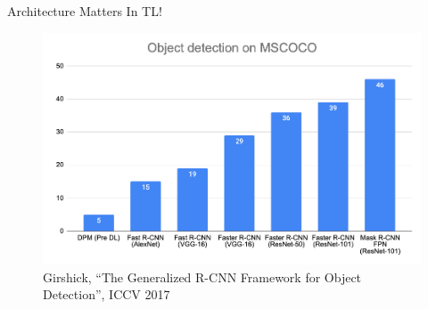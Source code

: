 \documentclass[serif, aspectratio=169]{beamer}
\begin{document}
\begin{frame}{Architecture Matters In TL!}
	\begin{figure}[htpb]
		\begin{center}
			\includegraphics[keepaspectratio, scale=0.25]{pic/od_mscoco}
			\captionsetup{justification=centering}
			\caption*{\scriptsize Girshick, “The Generalized R-CNN Framework for Object Detection”, ICCV 2017}
		\end{center}
	\end{figure}
\end{frame}
\end{document}
